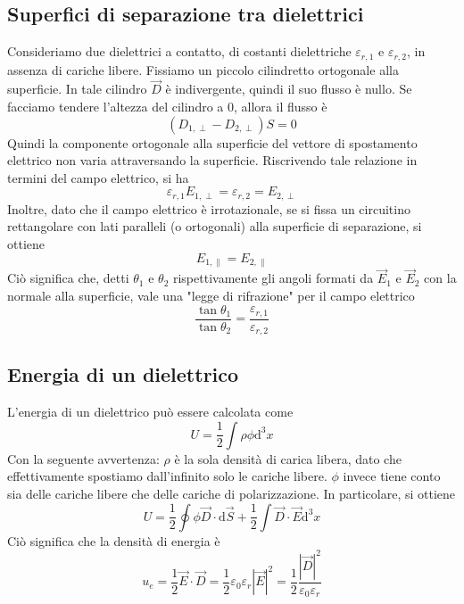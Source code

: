 \documentclass[a4paper,11pt]{book}
\newcommand{\dif}{\mathrm{d}}
\let\oldepsilon\epsilon
\let\oldvarepsilon\varepsilon
\renewcommand{\epsilon}{\oldvarepsilon}
\renewcommand{\varepsilon}{\oldepsilon}
\theoremstyle{definition}
\theoremstyle{theorem}
\begin{document}
\subsection{Superfici di separazione tra dielettrici}
Consideriamo due dielettrici a contatto, di costanti dielettriche $\epsilon_{r,1}$ e $\epsilon_{r,2}$, in assenza di cariche libere. Fissiamo un piccolo cilindretto ortogonale alla superficie. In tale cilindro $\vec{D}$ è indivergente, quindi il suo flusso è nullo. Se facciamo tendere l'altezza del cilindro a 0, allora il flusso è
\[(D_{1,\perp}-D_{2,\perp})S=0\]
Quindi la componente ortogonale alla superficie del vettore di spostamento elettrico non varia attraversando la superficie. Riscrivendo tale relazione in termini del campo elettrico, si ha \[\epsilon_{r,1}E_{1,\perp}=\epsilon_{r,2}=E_{2,\perp}\] Inoltre, dato che il campo elettrico è irrotazionale, se si fissa un circuitino rettangolare con lati paralleli (o ortogonali) alla superficie di separazione, si ottiene \[E_{1,\parallel}=E_{2,\parallel}\]
Ciò significa che, detti $\theta_1$ e $\theta_2$ rispettivamente gli angoli formati da $\vec{E}_1$ e $\vec{E}_2$ con la normale alla superficie, vale una "legge di rifrazione" per il campo elettrico
\[\frac{\tan\theta_1}{\tan\theta_2}=\frac{\epsilon_{r,1}}{\epsilon_{r,2}}\]
\subsection{Energia di un dielettrico}
L'energia di un dielettrico può essere calcolata come
\[U=\frac{1}{2}\int\rho\phi\dif^3x\]
Con la seguente avvertenza: $\rho$ è la sola densità di carica libera, dato che effettivamente spostiamo dall'infinito solo le cariche libere. $\phi$ invece tiene conto sia delle cariche libere che delle cariche di polarizzazione. In particolare, si ottiene 
\[U=\frac{1}{2}\oint\phi\vec{D}\cdot\dif\vec{S}+\frac{1}{2}\int\vec{D}\cdot\vec{E}\dif^3x\]
Ciò significa che la densità di energia è
\[u_e=\frac{1}{2}\vec{E}\cdot\vec{D}=\frac{1}{2}\epsilon_0\epsilon_r|\vec{E}|^2=\frac{1}{2}\frac{|\vec{D}|^2}{\epsilon_0\epsilon_r}\]
\end{document}
